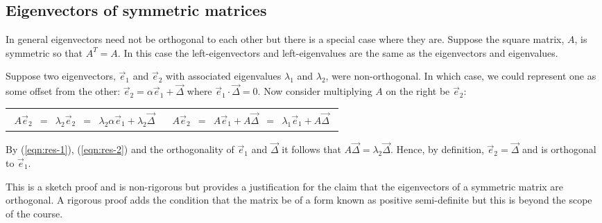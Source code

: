 \documentclass[a4paper]{article}
\newcommand{\highlight}[1]{{\color{blue}#1}}
\begin{document}
\subsection{Eigenvectors of symmetric matrices}

In general eigenvectors need not be orthogonal to each other but there is a
special case where they are. Suppose the square matrix, $A$, is symmetric so
that $A^T = A$. In this case the left-eigenvectors and left-eigenvalues are the
same as the eigenvectors and eigenvalues.

Suppose two eigenvectors, $\vec{e}_1$ and $\vec{e}_2$ with associated
eigenvalues $\lambda_1$ and $\lambda_2$, were non-orthogonal. In which case, we
could represent one as some offset from the other: $\vec{e}_2 = \alpha \vec{e}_1
+ \vec{\Delta}$ where $\vec{e}_1 \cdot \vec{\Delta} = 0$.  Now consider
multiplying $A$ on the right be $\vec{e}_2$:

\begin{centering}\begin{tabular}{rl}
\parbox{0.4\columnwidth}{\centering
\begin{eqnarray}
  A \vec{e}_2 &=& \lambda_2 \vec{e}_2 \nonumber \\
  &=& \lambda_2 \alpha \vec{e}_1 + \lambda_2 \vec{\Delta} \label{eqn:res-1}
\end{eqnarray}\\
}&
\parbox{0.4\columnwidth}{\centering
\begin{eqnarray}
  A \vec{e}_2 &=& A \vec{e}_1 + A \vec{\Delta} \nonumber \\
  &=& \lambda_1 \vec{e}_1 + A \vec{\Delta} \label{eqn:res-2}
\end{eqnarray}\\
}\\
\end{tabular}
\end{centering}

\noindent By (\ref{eqn:res-1}), (\ref{eqn:res-2}) and the orthogonality of
$\vec{e}_1$ and $\vec{\Delta}$ it follows that $A\vec{\Delta} = \lambda_2
\vec{\Delta}$.  Hence, by definition, $\vec{e}_2 = \vec{\Delta}$ and is
orthogonal to $\vec{e}_1$.

This is a sketch proof and is non-rigorous but provides a justification for the
claim that \highlight{the eigenvectors of a symmetric matrix are orthogonal}. A
rigorous proof adds the condition that the matrix be of a form known as positive
semi-definite but this is beyond the scope of the course.
\end{document}
